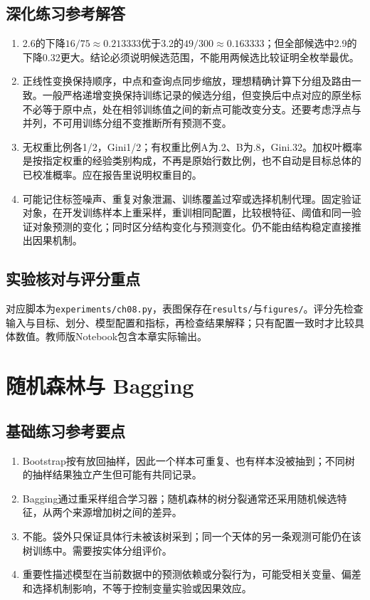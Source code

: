 \section*{深化练习参考解答}
\begin{enumerate}[label=D\arabic*.]
\item 2.6的下降$16/75\approx0.213333$优于3.2的$49/300\approx0.163333$；但全部候选中2.9的下降0.32更大。结论必须说明候选范围，不能用两候选比较证明全枚举最优。
\item 正线性变换保持顺序，中点和查询点同步缩放，理想精确计算下分组及路由一致。一般严格递增变换保持训练记录的候选分组，但变换后中点对应的原坐标不必等于原中点，处在相邻训练值之间的新点可能改变分支。还要考虑浮点与并列，不可用训练分组不变推断所有预测不变。
\item 无权重比例各1/2，Gini1/2；有权重比例A为.2、B为.8，Gini$.32$。加权叶概率是按指定权重的经验类别构成，不再是原始行数比例，也不自动是目标总体的已校准概率。应在报告里说明权重目的。
\item 可能记住标签噪声、重复对象泄漏、训练覆盖过窄或选择机制代理。固定验证对象，在开发训练样本上重采样，重训相同配置，比较根特征、阈值和同一验证对象预测的变化；同时区分结构变化与预测变化。仍不能由结构稳定直接推出因果机制。
\end{enumerate}

\section*{实验核对与评分重点}
对应脚本为\texttt{experiments/ch08.py}，表图保存在\texttt{results/}与\texttt{figures/}。评分先检查输入与目标、划分、模型配置和指标，再检查结果解释；只有配置一致时才比较具体数值。教师版Notebook包含本章实际输出。

\chapter{随机森林与 Bagging}
\section*{基础练习参考要点}
\begin{enumerate}[label=\arabic*.]
\item Bootstrap按有放回抽样，因此一个样本可重复、也有样本没被抽到；不同树的抽样结果独立产生但可能有共同记录。
\item Bagging通过重采样组合学习器；随机森林的树分裂通常还采用随机候选特征，从两个来源增加树之间的差异。
\item 不能。袋外只保证具体行未被该树采到；同一个天体的另一条观测可能仍在该树训练中。需要按实体分组评价。
\item 重要性描述模型在当前数据中的预测依赖或分裂行为，可能受相关变量、偏差和选择机制影响，不等于控制变量实验或因果效应。
\end{enumerate}
